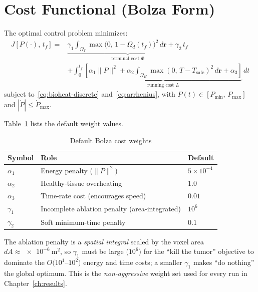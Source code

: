 \section{Cost Functional (Bolza Form)}

The optimal control problem minimizes:
\begin{equation}
\begin{aligned}
    J[P(\cdot),\, t_f]
    = {}& \underbrace{
        \gamma_1 \int_{\Omega_T}\!\!\max\bigl(0,\,1-\Omega_d(t_f)\bigr)^2\,d\mathbf{r}
        + \gamma_2\,t_f
      }_{\text{terminal cost } \Phi} \\
    &+ \int_0^{t_f}\!\!
      \underbrace{
        \left[
          \alpha_1\|P\|^2
          + \alpha_2 \int_{\Omega_H}\!\!\max(0,\,T - T_{\text{safe}})^2\,d\mathbf{r}
          + \alpha_3
        \right]
      }_{\text{running cost } L}\,dt
\end{aligned}
    \label{eq:cost}
\end{equation}
subject to~\eqref{eq:bioheat-discrete} and~\eqref{eq:arrhenius},
with $P(t) \in [P_{\min},\, P_{\max}]$ and $|\dot{P}| \leq \dot{P}_{\max}$.

Table~\ref{tab:cost-weights} lists the default weight values.

\begin{table}[htbp]
\centering
\caption{Default Bolza cost weights}
\label{tab:cost-weights}
\renewcommand{\arraystretch}{1.4}
\begin{tabular}{lll}
\toprule
Symbol & Role & Default \\
\midrule
$\alpha_1$ & Energy penalty ($\|P\|^2$) & $5\times10^{-4}$ \\
$\alpha_2$ & Healthy-tissue overheating & $1.0$ \\
$\alpha_3$ & Time-rate cost (encourages speed) & $0.01$ \\
$\gamma_1$ & Incomplete ablation penalty (area-integrated) & $10^{6}$ \\
$\gamma_2$ & Soft minimum-time penalty & $0.1$ \\
\bottomrule
\end{tabular}
\end{table}

The ablation penalty is a \emph{spatial integral} scaled by the voxel
area $dA \approx \SI{e-6}{\square\meter}$, so $\gamma_1$ must be large
($10^6$) for the ``kill the tumor'' objective to dominate the
$O(10^1$--$10^2)$ energy and time costs; a smaller $\gamma_1$ makes
``do nothing'' the global optimum. This is the \emph{non-aggressive}
weight set used for every run in Chapter~\ref{ch:results}.

